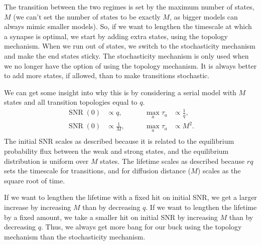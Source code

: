 \documentclass[12pt]{article}
\DeclareMathOperator{\snr}{SNR}
\begin{document}
The transition between the two regimes is set by the maximum number of states, \(M\) (we can't set the number of states to be exactly \(M\), as bigger models can always mimic smaller models).
So, if we want to lengthen the timescale at which a synapse is optimal, we start by adding extra states, using the topology mechanism.
When we run out of states, we switch to the stochasticity mechanism and make the end states sticky.
The stochasticity mechanism is only used when we no longer have the option of using the topology mechanism.
It is always better to add more states, if allowed, than to make transitions stochastic.

We can get some insight into why this is by considering a serial model with \(M\) states and all transition topologies equal to \(q\).
%
\begin{equation*}
\begin{aligned}
  \snr(0) &\propto q,
  &\qquad
  \max_a \tau_a &\propto \frac{1}{q}, \\
  \snr(0) &\propto \frac{1}{M},
  &\qquad
  \max_a \tau_a &\propto M^2. \\
\end{aligned}
\end{equation*}
%
The initial SNR scales as described because it is related to the equilibrium probability flux between the weak and strong states, and the equilibrium distribution is uniform over \(M\) states.
The lifetime scales as described because \(rq\) sets the timescale for transitions, and for diffusion distance (\(M\)) scales as the square root of time.

If we want to lengthen the lifetime with a fixed hit on initial SNR, we get a larger increase by increasing \(M\) than by decreasing \(q\).
If we want to lengthen the lifetime by a fixed amount, we take a smaller hit on initial SNR by increasing \(M\) than by decreasing \(q\).
Thus, we always get more bang for our buck using the topology mechanism than the stochasticity mechanism.













\end{document}
